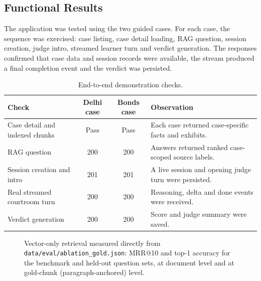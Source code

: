 \documentclass[12pt]{article}
\begin{document}
\subsection{Functional Results}
The application was tested using the two guided cases. For each case, the sequence was exercised: case listing, case detail loading, RAG question, session creation, judge intro, streamed learner turn and verdict generation. The responses confirmed that case data and session records were available, the stream produced a final completion event and the verdict was persisted.
\begin{table}[!htbp]\centering\caption{End-to-end demonstration checks.}\label{tab:results}\begin{tabularx}{0.95\textwidth}{p{}ccX}\toprule Check & Delhi case & Bonds case & Observation \\ \midrule Case detail and indexed chunks & Pass & Pass & Each case returned case-specific facts and exhibits. \\ RAG question & 200 & 200 & Answers returned ranked case-scoped source labels. \\ Session creation and intro & 201 & 201 & A live session and opening judge turn were persisted. \\ Real streamed courtroom turn & 200 & 200 & Reasoning, delta and done events were received. \\ Verdict generation & 200 & 200 & Score and judge summary were saved. \\ \bottomrule\end{tabularx}\end{table}




\begin{figure}[t]
\centering
{}
\caption{Vector-only retrieval measured directly from \texttt{data/eval/ablation\_gold.json}: MRR@10 and top-1 accuracy for the benchmark and held-out question sets, at document level and at gold-chunk (paragraph-anchored) level.}
\label{fig:evalchart}
\end{figure}
\end{document}
